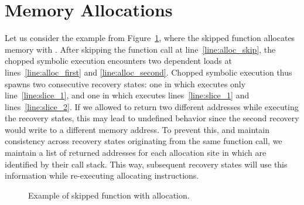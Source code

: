 
\section{Memory Allocations}
\label{Se:Malloc}

Let us consider the example from
Figure~\ref{fig:slices-with-allocations}, where the skipped function
 allocates memory with . After skipping the
function call at line~\ref{line:alloc_skip}, the chopped symbolic
execution encounters two dependent loads at
lines~\ref{line:alloc_first} and \ref{line:alloc_second}. Chopped
symbolic execution thus spawns two consecutive recovery states: one in
which executes only line~\ref{line:slice_1}, and one in which executes lines~\ref{line:slice_1} and
lines~\ref{line:slice_2}. If we allowed  to return two different addresses while
executing the recovery states, this may lead to undefined behavior
since the second recovery would write to a different memory
address. To prevent this, and maintain consistency across recovery
states originating from the same function call, we maintain a list of
returned addresses for each allocation site in  which are
identified by their call stack. This way, subsequent recovery states
will use this information while re-executing allocating instructions.

\begin{figure}[tbp]
  \vspace{-2mm}
  \caption{Example of skipped function with allocation.}\vspace{-4mm}
\label{fig:slices-with-allocations}
\end{figure}

